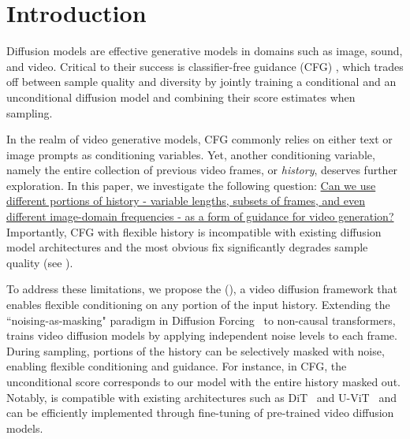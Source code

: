 \section{Introduction}
Diffusion models are effective generative models in  domains such as image, sound, and video. Critical to their success is classifier-free guidance (CFG) \cite{ho2022classifierfree}, which trades off between sample quality and diversity by jointly training a conditional and an unconditional diffusion model and combining their score estimates when sampling.

In the realm of video generative models, CFG commonly relies on either text or image prompts as conditioning variables. Yet, another conditioning variable, namely the entire collection of previous video frames, or \emph{history},  deserves further exploration. In this paper, we investigate the following question: \ul{Can we use different portions of history - variable lengths, subsets of frames, and even different image-domain frequencies - as a form of guidance for video generation?}
{}
Importantly, CFG with flexible history is incompatible with existing diffusion model architectures and the most obvious fix significantly degrades sample quality   (see ). %

To address these limitations, we propose the \method (\mtd), a video diffusion framework that enables flexible conditioning on any portion of the input history. Extending the ``noising-as-masking" paradigm in Diffusion Forcing~\cite{chen2024diffusion} to non-causal transformers, \mtd trains video diffusion models by applying independent noise levels to each frame. During sampling, portions of the history can be selectively masked with noise, enabling flexible conditioning and guidance. For instance, in CFG, the unconditional score corresponds to our model with the entire history masked out. Notably, \mtd is compatible with existing architectures such as DiT~\cite{peebles2023scalable} and U-ViT~\cite{hoogeboom2023simple, hoogeboom2024simpler} and can be efficiently implemented through fine-tuning of pre-trained video diffusion models.


